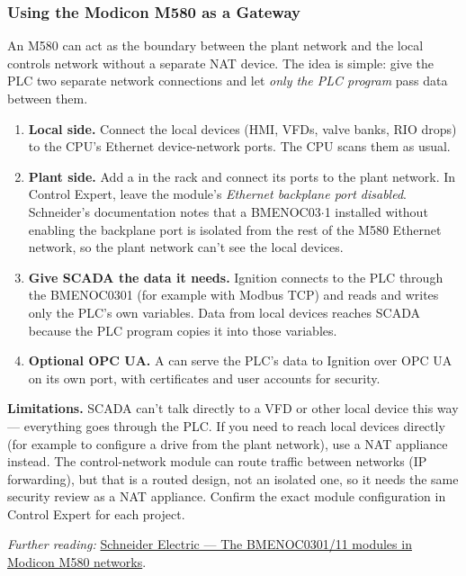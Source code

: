 \subsubsection*{Using the Modicon M580 as a Gateway}\label{sec:m580-gateway}
An M580 can act as the boundary between the plant network and the local controls network without a separate NAT device. The idea is simple: give the PLC two separate network connections and let \emph{only the PLC program} pass data between them.
\begin{enumerate}[itemsep=2pt]
  \item \textbf{Local side.} Connect the local devices (HMI, VFDs, valve banks, RIO drops) to the CPU's Ethernet device-network ports. The CPU scans them as usual.
  \item \textbf{Plant side.} Add a  in the rack and connect its ports to the plant network. In Control Expert, leave the module's \emph{Ethernet backplane port disabled}. Schneider's documentation notes that a BMENOC03$\cdot$1 installed without enabling the backplane port is isolated from the rest of the M580 Ethernet network, so the plant network can't see the local devices.
  \item \textbf{Give SCADA the data it needs.} Ignition connects to the PLC through the BMENOC0301 (for example with Modbus TCP) and reads and writes only the PLC's own variables. Data from local devices reaches SCADA because the PLC program copies it into those variables.
  \item \textbf{Optional OPC UA.} A  can serve the PLC's data to Ignition over OPC UA on its own port, with certificates and user accounts for security.
\end{enumerate}
\textbf{Limitations.} SCADA can't talk directly to a VFD or other local device this way --- everything goes through the PLC. If you need to reach local devices directly (for example to configure a drive from the plant network), use a NAT appliance instead. The  control-network module can route traffic between networks (IP forwarding), but that is a routed design, not an isolated one, so it needs the same security review as a NAT appliance. Confirm the exact module configuration in Control Expert for each project.

\textit{Further reading:} \href{https://filedn.eu/l6oFb0aAwOAyRLLaUMiUmzz/CE_HELP/eng/BMENOC03x1/BMENOC03x1_D-SE-0035359.htm}{Schneider Electric --- The BMENOC0301/11 modules in Modicon M580 networks}.

